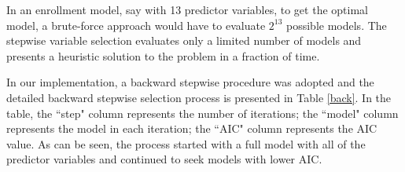 \documentclass[12pt,english]{report}
\begin{document}
In an enrollment model, say with 13 predictor variables, to get the optimal
model, a brute-force approach would have to evaluate $2^{13}$ possible models.
The stepwise variable selection evaluates only a limited number of models and
presents a heuristic solution to the problem in a fraction of time.

In our implementation, a backward stepwise procedure was adopted and the
detailed backward stepwise selection process is presented in Table \ref{back}.
In the table, the ``step" column represents the number of iterations; the
``model" column represents the model in each iteration; the ``AIC" column
represents the AIC value.  As can be seen, the process started with a full
model with all of the predictor variables and continued to seek models with
lower AIC.

\begin{table}
\end{table}
\end{document}

